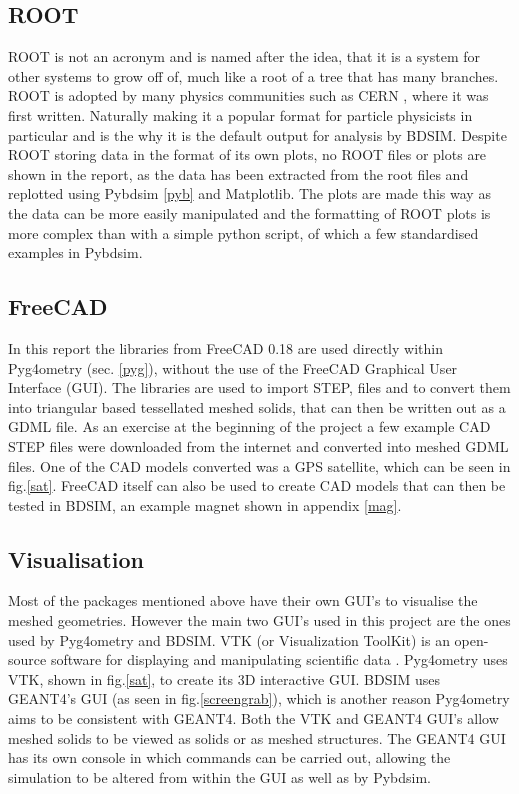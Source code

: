 \documentclass[12pt,a4paper]{article}
\begin{document}
\subsection{ROOT}\label{root}
ROOT is not an acronym and is named after the idea, that it is a system for other systems to grow off of, much like a root of a tree that has many branches. ROOT is adopted by many physics communities such as CERN \cite{cern}, where it was first written. Naturally making it a popular format for particle physicists in particular and is the why it is the default output for analysis by BDSIM. Despite ROOT storing data in the format of its own plots, no ROOT files or plots are shown in the report, as the data has been extracted from the root files and replotted using Pybdsim \ref{pyb} and Matplotlib. The plots are made this way as the data can be more easily manipulated and the formatting of ROOT plots is more complex than with a simple python script, of which a few standardised examples in Pybdsim.

\subsection{FreeCAD}
In this report the libraries from FreeCAD 0.18 \cite{18} are used directly within Pyg4ometry (sec. \ref{pyg}), without the use of the FreeCAD Graphical User Interface (GUI). The libraries are used to import STEP, files and to convert them into triangular based tessellated meshed solids, that can then be written out as a GDML file. As an exercise at the beginning of the project a few example CAD STEP files were downloaded from the internet and converted into meshed GDML files. One of the CAD models converted was a GPS satellite, which can be seen in fig.\ref{sat}. FreeCAD itself can also be used to create CAD models that can then be tested in BDSIM, an example magnet shown in appendix \ref{mag}.

\subsection{Visualisation}
\label{vis}
Most of the packages mentioned above have their own GUI's to visualise the meshed geometries. However the main two GUI's used in this project are the ones used by Pyg4ometry and BDSIM. VTK (or Visualization ToolKit) is an open-source software for displaying and manipulating scientific data \cite{vtk}. Pyg4ometry uses VTK, shown in fig.\ref{sat}, to create its 3D interactive GUI. BDSIM uses GEANT4's GUI (as seen in fig.\ref{screengrab}), which is another reason Pyg4ometry aims to be consistent with GEANT4. Both the VTK and GEANT4 GUI's allow meshed solids to be viewed as solids or as meshed structures. The GEANT4 GUI has its own console in which commands can be carried out, allowing the simulation to be altered from within the GUI as well as by Pybdsim.
\end{document}
